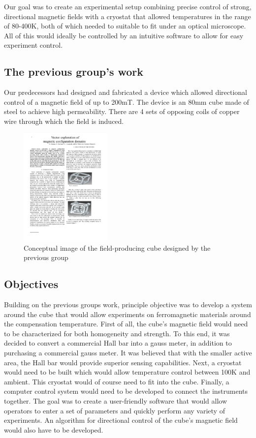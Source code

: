 \documentclass[journal]{IEEEtran}
\begin{document}
Our goal was to create an experimental setup combining precise control of strong, directional magnetic fields with a cryostat that allowed temperatures in the range of 80-400K, both of which needed to suitable to fit under an optical microscope. All of this would ideally be controlled by an intuitive software to allow for easy experiment control.

\subsection{The previous group's work}
Our predecessors had designed and fabricated a device which allowed directional control of a magnetic field of up to 200mT. The device is an 80mm cube made of steel to achieve high permeability. There are 4 sets of opposing coils of copper wire through which the field is induced.
\begin{figure}[h]
\centering
\includegraphics[width=0.4\textwidth]{cube}
\caption{Conceptual image of the field-producing cube designed by the previous group}
\end{figure}

\subsection{Objectives}
Building on the previous groups work, principle objective was to develop a system around the cube that would allow experiments on ferromagnetic materials around the compensation temperature. First of all, the cube's magnetic field would need to be characterized for both homogeneity and strength. To this end, it was decided to convert a commercial Hall bar into a gauss meter, in addition to purchasing a commercial gauss meter. It was believed that with the smaller active area, the Hall bar would provide superior sensing capabilities. Next, a cryostat would need to be built which would allow temperature control between 100K and ambient. This cryostat would of course need to fit into the cube. Finally, a computer control system would need to be developed to connect the instruments together. The goal was to create a user-friendly software that would allow operators to enter a set of parameters and quickly perform any variety of experiments. An algorithm for directional control of the cube's magnetic field would also have to be developed. 
\end{document}
